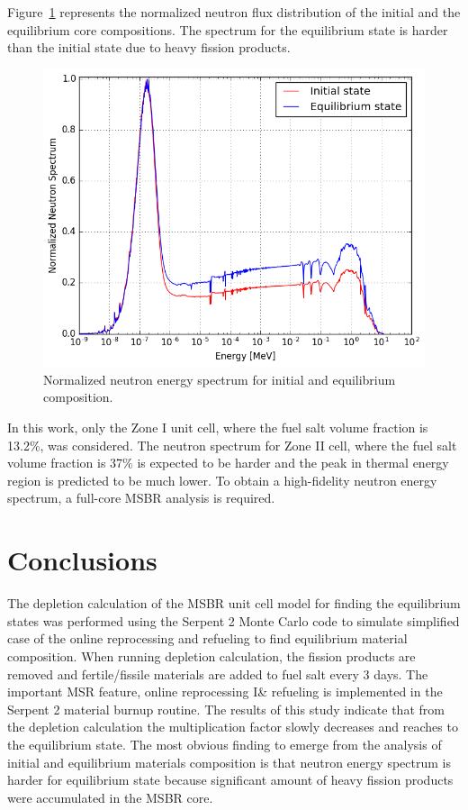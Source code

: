 \documentclass{anstrans}
\begin{document}
Figure~\ref{fig:spectrum} represents the normalized neutron flux distribution 
of the initial and the equilibrium core compositions. The spectrum for the 
equilibrium state is harder than the initial state due to heavy fission 
products.  
\begin{figure}[htbp!] %
        \centering
        \includegraphics[width=1.04\linewidth]{spectrum.png}
        \caption{Normalized neutron energy spectrum for initial and equilibrium 
        composition.}
        \label{fig:spectrum}
\end{figure}

\FloatBarrier 

In this work, only the Zone I unit cell, where the fuel salt volume fraction is 
13.2\%, was considered. The neutron spectrum for Zone II cell, where the fuel 
salt volume fraction is 37\% is expected to be harder and the peak in thermal 
energy region is predicted to be much 
lower. To obtain a high-fidelity neutron energy spectrum, a full-core \gls{MSBR}
analysis is required.
\section{Conclusions}
The depletion calculation of the \gls{MSBR} unit cell model for finding the 
equilibrium states was performed using the Serpent 2 Monte Carlo code to 
simulate simplified case of the online reprocessing and refueling to find 
equilibrium material composition. When running depletion calculation, the 
fission products are removed and fertile/fissile materials are added to fuel 
salt every 3 days. The important MSR feature, online reprocessing I\& refueling 
is implemented in the Serpent 2 material burnup routine. The results of this 
study indicate that from the depletion calculation the multiplication factor 
slowly decreases and reaches to the equilibrium state. The most obvious finding 
to emerge from the analysis of initial and equilibrium materials composition is 
that neutron energy spectrum is harder for equilibrium state because 
significant amount of heavy fission products were accumulated in the \gls{MSBR} 
core.
\end{document}
